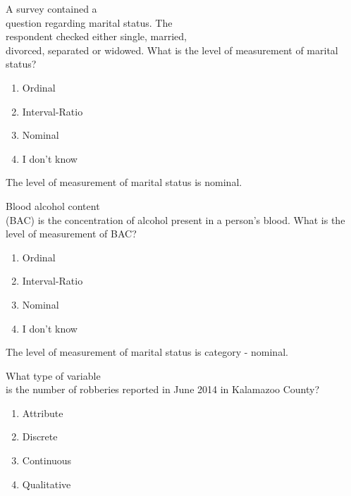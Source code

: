 \documentclass[11pt]{book}\usepackage[]{graphicx}\usepackage[]{color}
\begin{document}
\begin{exercises}
\begin{exercise}
  A survey contained a \\ question regarding marital status.   The \\ respondent checked either single, married,  \\ divorced, separated or widowed.  What is the level of measurement of marital status?
	  \begin{enumerate}
	  \item Ordinal
	  \item Interval-Ratio
	  \item Nominal
	  \item I don't know
	  \end{enumerate}
	  \vspace{3mm}
	\end{exercise}
	\vspace{2mm}
	\begin{solution}
	  The level of measurement of marital status is nominal.
	\end{solution}

  \begin{exercise} %

  Blood alcohol content \\ (BAC) is the concentration of alcohol present in a person's blood.  What is the level of measurement of BAC?
	  \begin{enumerate}
	  \samepage
	  \item Ordinal
	  \samepage
  	\item Interval-Ratio
  	\samepage
	  \item Nominal
	  \samepage
	  \item I don't know
	  \samepage
	  \end{enumerate}
	  \samepage
	  \vspace{3mm}
	\end{exercise}
	\vspace{2mm}
	\begin{solution}
	  The level of measurement of marital status is category - nominal.
	\end{solution}

  \begin{exercise}  %

  What type of variable \\ is the number of robberies reported in June 2014 in Kalamazoo County?
	  \begin{enumerate}
  	\samepage
  	\item Attribute
  	\samepage
  	\item Discrete
  	\samepage
  	\item Continuous
  	\samepage
  	\item Qualitative
  	\end{enumerate}
  	\vspace{3mm}
  \end{exercise}
  \vspace{2mm}
	\begin{solution}
	

\end{solution}
\end{exercises}
\end{document}
